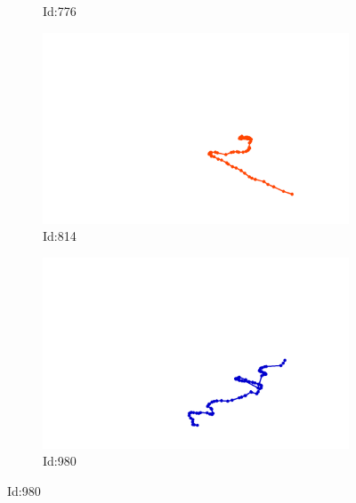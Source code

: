 \documentclass[12pt,twoside]{report}
\begin{document}
\begin{figure}
\begin{subfigure}[b]{0.20\textwidth}
\caption{Id:776}
\end{subfigure}
\begin{subfigure}[b]{0.20\textwidth}
\centering
\includegraphics[width=\textwidth]{../../trajectories/814.png}
\caption{Id:814}
\end{subfigure}
\begin{subfigure}[b]{0.20\textwidth}
\centering
\includegraphics[width=\textwidth]{../../trajectories/980.png}
\caption{Id:980}
\end{subfigure}
\end{figure}
\end{document}
